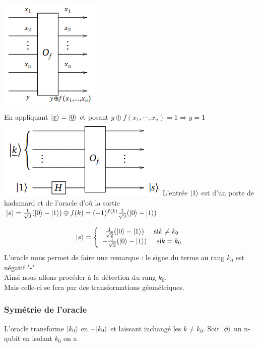 \documentclass[12pt,openany]{report}
\DeclarePairedDelimiter\ket{\lvert}{\rangle}
\begin{document}
\begin{center}
\includegraphics[scale=1]{./oracle_grover}
\end{center}
En appliquant $ \ket{\underline{x}}=\ket{\underline{0}}$ et posant $ y \oplus f(x_1,\cdots,x_n)=1  \Rightarrow y=1 $  \\
\includegraphics[scale=1]{./oracle_2}
L'entrée $\ket{1} $ est d'un porte de hadamard et de l'oracle  d'où la sortie
$\ket{s} =\frac{1}{\sqrt{2}}(\ket{0}-\ket{1})\oplus f(k)=(-1)^{f(k)}\frac{1}{\sqrt{2}}(\ket{0}-\ket{1})$


\[  
 \ket{s}= \left\lbrace 
\begin{array}{ c  c }
\frac{1}{\sqrt{2}}(\ket{0}-\ket{1})\hspace{0.5cm} \text{si} k \neq  k_0\\
 - \frac{1}{\sqrt{2}}(\ket{0}-\ket{1})\hspace{0.5cm} \text{si} k = k_0

\end{array}
\right.
\]
L'oracle nous permet de faire une remarque : le signe du terme au rang $k_0 $ est négatif "-" \\
Ainsi nous allons procéder à la détection du rang $k_0 $.\\ Mais celle-ci se fera par des transformations géométriques.
\subsubsection{Symétrie de l'oracle}
L'oracle transforme $\ket{k_0} $ en $-\ket{k_0} $ et laissant inchangé les $ k \neq k_0$. Soit $\ket{\phi}$ un n-qubit en isolant $k_0 $ on a
\end{document}
